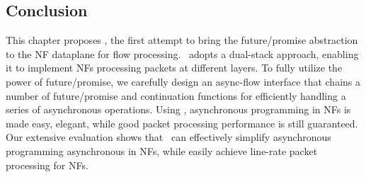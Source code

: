 

\subsection{Conclusion}

This chapter proposes \netstar, the first attempt to bring the future/promise abstraction to the NF dataplane for flow processing.  \netstar~adopts a dual-stack approach, enabling it to implement NFs processing packets at different layers. To fully utilize the power of future/promise, we carefully design an async-flow interface that chains a number of future/promise and continuation functions for efficiently handling a series of asynchronous operations. Using \netstar, asynchronous programming in NFs is made easy, elegant, while good packet processing performance is still guaranteed. Our extensive evaluation shows that \netstar~can effectively simplify asynchronous programming asynchronous in NFs, while easily achieve line-rate packet processing for NFs.
